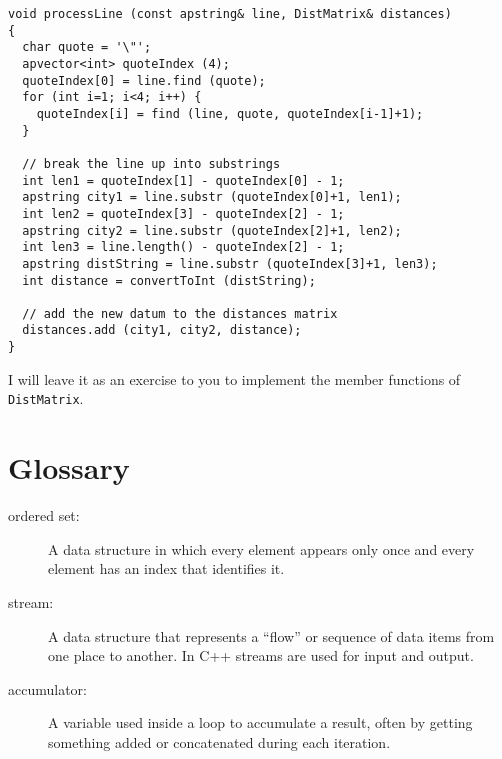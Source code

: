 \begin{verbatim}
void processLine (const apstring& line, DistMatrix& distances)
{
  char quote = '\"';
  apvector<int> quoteIndex (4);
  quoteIndex[0] = line.find (quote);
  for (int i=1; i<4; i++) {
    quoteIndex[i] = find (line, quote, quoteIndex[i-1]+1);
  }

  // break the line up into substrings
  int len1 = quoteIndex[1] - quoteIndex[0] - 1;
  apstring city1 = line.substr (quoteIndex[0]+1, len1);
  int len2 = quoteIndex[3] - quoteIndex[2] - 1;
  apstring city2 = line.substr (quoteIndex[2]+1, len2);
  int len3 = line.length() - quoteIndex[2] - 1;
  apstring distString = line.substr (quoteIndex[3]+1, len3);
  int distance = convertToInt (distString);

  // add the new datum to the distances matrix
  distances.add (city1, city2, distance);
}
\end{verbatim}
%
I will leave it as an exercise to you to implement the
member functions of {\tt DistMatrix}.


\section{Glossary}

\begin{description}

\item[ordered set:]  A data structure in which every element appears
only once and every element has an index that identifies it.

\item[stream:]  A data structure that represents a ``flow'' or
sequence of data items from one place to another.  In C++ streams
are used for input and output.

\item[accumulator:]  A variable used inside a loop to accumulate
a result, often by getting something added or concatenated during each
iteration.


\end{description}


